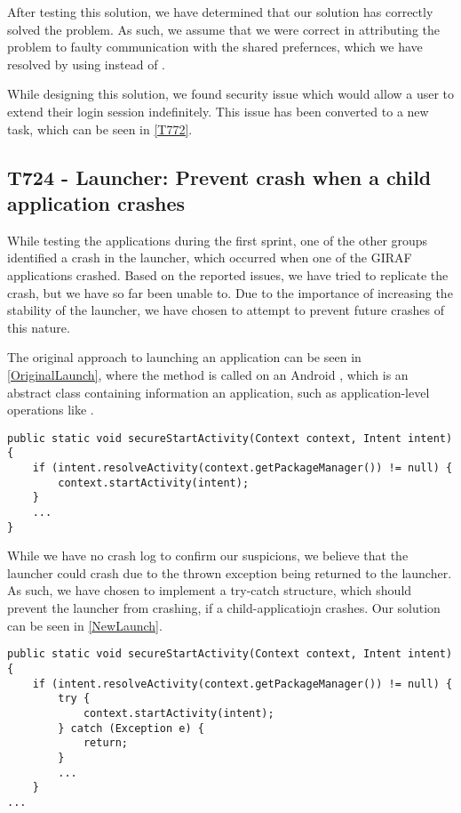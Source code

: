 After testing this solution, we have determined that our solution has correctly
solved the problem. As such, we assume that we were correct in attributing the
problem to faulty communication with the shared prefernces, which we have
resolved by using  instead of .\nl

While designing this solution, we found security issue which would allow a user
to extend their login session indefinitely. This issue has been converted to a
new task, which can be seen in \autoref{T772}.

\subsection{T724 - Launcher: Prevent crash when a child application crashes}
While testing the applications during the first sprint, one of the other groups
identified a crash in the launcher, which occurred when one of the GIRAF
applications crashed. Based on the reported issues, we have tried to
replicate the crash, but we have so far been unable to. Due to the importance of
increasing the stability of the launcher, we have chosen to attempt to prevent
future crashes of this nature.\nl

The original approach to launching an application can be seen in
\autoref{OriginalLaunch}, where the  method is called on an
Android , which is an abstract class containing information an
application, such as application-level operations like
.\nl

\begin{minipage}[H]{\linewidth}
\begin{lstlisting}[caption = Original approach to launching applications., label = OriginalLaunch]
public static void secureStartActivity(Context context, Intent intent) {
	if (intent.resolveActivity(context.getPackageManager()) != null) {	
    	context.startActivity(intent);
	}
	...
}
\end{lstlisting}
\end{minipage}

While we have no crash log to confirm our suspicions, we believe that the
launcher could crash due to the thrown exception being returned to the launcher.
As such, we have chosen to implement a try-catch structure, which should prevent
the launcher from crashing, if a child-applicatiojn crashes. Our solution can be 
seen in \autoref{NewLaunch}.\nl

\begin{minipage}[H]{\linewidth}
\begin{lstlisting}[caption = New approach to launching applications., label = NewLaunch] 
public static void secureStartActivity(Context context, Intent intent) {
	if (intent.resolveActivity(context.getPackageManager()) != null) {
    	try {
        	context.startActivity(intent);
        } catch (Exception e) {
        	return;
        }
        ...
    }
...
\end{lstlisting}
\end{minipage}

